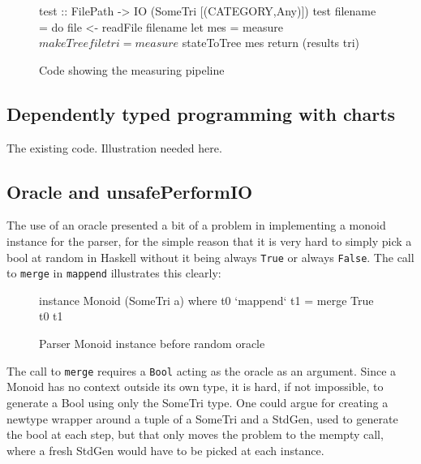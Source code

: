 \documentclass[a4paper,12pt,twosided]{report}
\begin{document}
\begin{figure}[H]
\begin{code}
test :: FilePath -> IO (SomeTri [(CATEGORY,Any)])
test filename = do
    file <- readFile filename
    let mes = measure $ makeTree file
        tri = measure $ stateToTree mes
    return (results tri)
\end{code} 
\caption{Code showing the measuring pipeline}
\end{figure}

\subsection{Dependently typed programming with charts}
The existing code. Illustration needed here.

\subsection{Oracle and unsafePerformIO}
The use of an oracle presented a bit of a problem in implementing a monoid
instance for the parser, for the simple reason that it is very hard to simply
pick a bool at random in Haskell without it being always \texttt{True} or always
\texttt{False}. The call to \texttt{merge} in \texttt{mappend} illustrates this
clearly:
\begin{figure}[H]
\begin{code}
instance Monoid (SomeTri a) where
    t0 `mappend` t1 = merge True t0 t1
\end{code}
\caption{Parser Monoid instance before random oracle}
\end{figure}
The call to \texttt{merge} requires a \texttt{Bool} acting as the oracle as an
argument. Since a Monoid has no context outside its own type, it is hard, if not
impossible, to generate a Bool using only the SomeTri type. One could argue for
creating a newtype wrapper around a tuple of a SomeTri and a StdGen, used to
generate the bool at each step, but that only moves the problem to the mempty
call, where a fresh StdGen would have to be picked at each instance.
\end{document}
